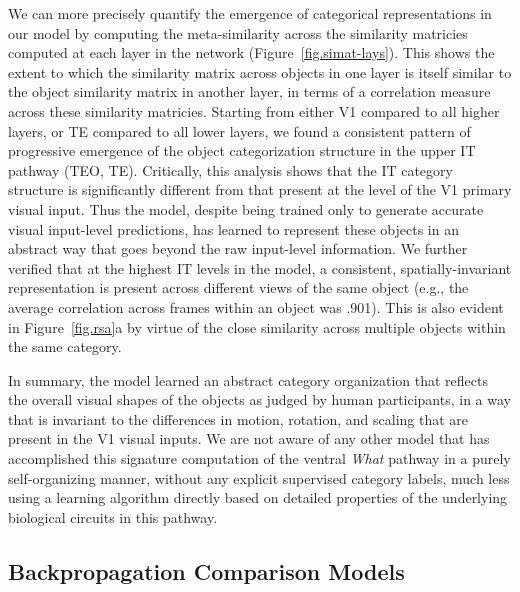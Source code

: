 \documentclass[11pt,twoside]{article}
\newif\myifpdf
\begin{document}
We can more precisely quantify the emergence of categorical representations in our model by computing the meta-similarity across the similarity matricies computed at each layer in the network (Figure~\ref{fig.simat-lays}).  This shows the extent to which the similarity matrix across objects in one layer is itself similar to the object similarity matrix in another layer, in terms of a correlation measure across these similarity matricies.  Starting from either V1 compared to all higher layers, or TE compared to all lower layers, we found a consistent pattern of progressive emergence of the object categorization structure in the upper IT pathway (TEO, TE).  Critically, this analysis shows that the IT category structure is significantly different from that present at the level of the V1 primary visual input.  Thus the model, despite being trained only to generate accurate visual input-level predictions, has learned to represent these objects in an abstract way that goes beyond the raw input-level information.  We further verified that at the highest IT levels in the model, a consistent, spatially-invariant representation is present across different views of the same object (e.g., the average correlation across frames within an object was .901).  This is also evident in Figure~\ref{fig.rsa}a by virtue of the close similarity across multiple objects within the same category.

In summary, the model learned an abstract category organization that reflects the overall visual shapes of the objects as judged by human participants, in a way that is invariant to the differences in motion, rotation, and scaling that are present in the V1 visual inputs.  We are not aware of any other model that has accomplished this signature computation of the ventral \emph{What} pathway in a purely self-organizing manner, without any explicit supervised category labels, much less using a learning algorithm directly based on detailed properties of the underlying biological circuits in this pathway.

\subsection{Backpropagation Comparison Models}
\end{document}
